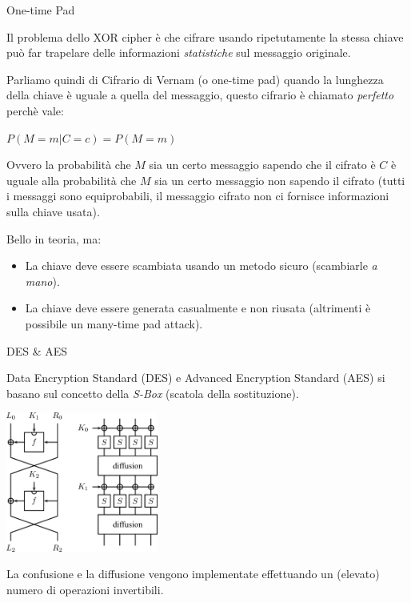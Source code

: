 \documentclass[xcolor=dvipsnames,aspectratio=169]{beamer}
\begin{document}
\begin{frame}{One-time Pad}
  
  \pause
  
  Il problema dello XOR cipher è che cifrare usando ripetutamente la stessa chiave può far trapelare delle informazioni \textit{statistiche} sul messaggio originale.
  
  \medskip
  
  \pause
  Parliamo quindi di Cifrario di Vernam (o one-time pad) quando la lunghezza della chiave è uguale a quella del messaggio, questo cifrario è chiamato \textit{perfetto} perchè vale:
  
  \medskip
  
  $P(M = m | C = c) = P(M = m)$
  
  \medskip
  
  Ovvero la probabilità che $M$ sia un certo messaggio sapendo che il cifrato è $C$ è uguale alla probabilità che $M$ sia un certo messaggio non sapendo il cifrato (tutti i messaggi sono equiprobabili, il messaggio cifrato non ci fornisce informazioni sulla chiave usata).
  
  \medskip
  
  \pause

  Bello in teoria, ma:
  
  \begin{itemize}
    \item La chiave deve essere scambiata usando un metodo sicuro (scambiarle \textit{a mano}).
    \item La chiave deve essere generata casualmente e non riusata (altrimenti è possibile un many-time pad attack).
  \end{itemize}
  
\end{frame}

\begin{frame}{DES \& AES}
  
  Data Encryption Standard (DES) e Advanced Encryption Standard (AES) si basano sul concetto della \textit{S-Box} (scatola della sostituzione).

  \pause
  
  \medskip
  
  \centering\includegraphics[width=5cm]{img/des} 
  
  \medskip

  La confusione e la diffusione vengono implementate effettuando un (elevato) numero di operazioni invertibili.
  
\end{frame}
\end{document}
